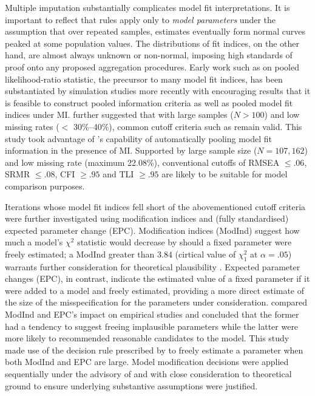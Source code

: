 \documentclass[a4paper,11pt,UKenglish,twoside,openright]{report}\usepackage[]{graphicx}\usepackage[]{color}
\begin{document}
Multiple imputation substantially complicates model fit interpretations. It is important to reflect that  rules apply only to \emph{model parameters} under the assumption that over repeated samples, estimates eventually form normal curves peaked at some population values. The distributions of fit indices, on the other hand, are almost always unknown or non-normal, imposing high standards of proof onto any proposed aggregation procedures. Early work such as \textcite{meng:1992} on pooled likelihood-ratio statistic, the precursor to many model fit indices, has been substantiated by simulation studies more recently with encouraging results that it is feasible to construct pooled information criteria \parencite{claeskens:2008} as well as pooled model fit indices \parencite{asparouhov:2010a} under MI. \textcite{enders:2018} further suggested that with large samples ($N>100$) and low missing rates ($<$ 30\%--40\%), common cutoff criteria such as \textcite{hu:1999} remain valid. This study took advantage of \CM's capability of automatically pooling model fit information in the presence of MI. Supported by large sample size ($N=107,162$) and low missing rate (maximum 22.08\%), conventional cutoffs of RMSEA $\leq .06$, SRMR $\leq .08$, CFI $\geq .95$ and TLI $\geq .95$ are likely to be suitable for model comparison purposes.

Iterations whose model fit indices fell short of the abovementioned cutoff criteria were further investigated using modification indices and (fully standardised) expected parameter change (EPC). Modification indices (ModInd) suggest how much a model's $\chi^2$ statistic would decrease by should a fixed parameter were freely estimated; a ModInd greater than $3.84$ (cirtical value of $\chi^2_1$ at $\alpha=.05$) warrants further consideration for theoretical plausibility \parencite{whittaker:2012}. Expected parameter changes (EPC), in contrast, indicate the estimated value of a fixed parameter if it were added to a model and freely estimated, providing a more direct estimate of the size of the misspecification for the parameters under consideration. \textcite{kaplan:1989} compared ModInd and EPC's impact on empirical studies and concluded that the former had a tendency to suggest freeing implausible parameters while the latter were more likely to recommended reasonable candidates to the model. This study made use of the decision rule prescribed by \textcite{saris:1987} to freely estimate a parameter when both ModInd and EPC are large. Model modification decisions were applied sequentially under the advisory of \textcite{maccallum:1992} and with close consideration to theoretical ground to ensure underlying substantive assumptions were justified.
\end{document}
